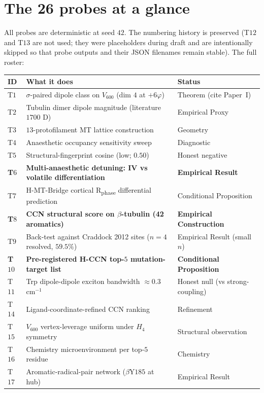 \documentclass[11pt,a4paper]{article}
\begin{document}
\section{The 26 probes at a glance}

All probes are deterministic at seed $42$. The numbering history is
preserved (T$12$ and T$13$ are not used; they were placeholders during
draft and are intentionally skipped so that probe outputs and their JSON
filenames remain stable). The full roster:

\begin{center}\small
\begin{tabular}{lll}\toprule
ID & What it does & Status \\\midrule
T$1$ & $\sigma$-paired dipole class on $V_{600}$ (dim $4$ at $+6\varphi$) & Theorem (cite Paper~I) \\
T$2$ & Tubulin dimer dipole magnitude (literature $1700$ D) & Empirical Proxy \\
T$3$ & $13$-protofilament MT lattice construction & Geometry \\
T$4$ & Anaesthetic occupancy sensitivity sweep & Diagnostic \\
T$5$ & Structural-fingerprint cosine (low; $0.50$) & Honest negative \\
\textbf{T$6$} & \textbf{Multi-anaesthetic detuning: IV vs volatile differentiation} & \textbf{Empirical Result} \\
T$7$ & H-MT-Bridge cortical R\textsubscript{phase} differential prediction & Conditional Proposition \\
\textbf{T$8$} & \textbf{CCN structural score on $\beta$-tubulin (42 aromatics)} & \textbf{Empirical Construction} \\
T$9$ & Back-test against Craddock 2012 sites ($n=4$ resolved, $59.5\%$) & Empirical Result (small $n$) \\
\textbf{T$10$} & \textbf{Pre-registered H-CCN top-$5$ mutation-target list} & \textbf{Conditional Proposition} \\
T$11$ & Trp dipole-dipole exciton bandwidth $\approx 0.3$ cm$^{-1}$ & Honest null (vs strong-coupling) \\
T$14$ & Ligand-coordinate-refined CCN ranking & Refinement \\
T$15$ & $V_{600}$ vertex-leverage uniform under $H_4$ symmetry & Structural observation \\
T$16$ & Chemistry microenvironment per top-$5$ residue & Chemistry \\
T$17$ & Aromatic-radical-pair network ($\beta$Y$185$ at hub) & Empirical Result \\

\end{tabular}
\end{center}
\end{document}
